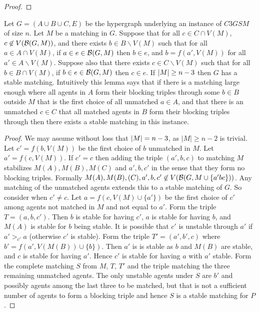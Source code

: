 \begin{definition}
\begin{proof}
\end{proof}
\begin{lemma}
Let $G=(A\cup B \cup C, E)$ be the hypergraph underlying an instance of $C3GSM$ of size $n$. Let $M$ be a matching in $G$. Suppose that for all $c \in C \cap V(M)$, $c \not\in V(\mathcal{B}(G, M))$, and there exists $b \in B \backslash V(M)$ such that for all $a \in A \cap V(M)$, if $a\in e \in \mathcal{B}(G,M)$ then $b \in e$, and $b = f(a',V(M))$ for all $a'\in A \backslash V(M)$. Suppose also that there exists $c \in C\backslash V(M)$ such that for all $b \in B \cap V(M)$, if $b \in e \in \mathcal{B}(G,M)$ then $c \in e$. If $\left|M\right| \geq n-3$ then $G$ has a stable matching. Intuitively this lemma says that if there is a matching large enough where all agents in $A$ form their blocking triples through some $b \in B$ outside $M$ that is the first choice of all unmatched $a \in A$, and that there is an unmatched $c \in C$ that all matched agents in $B$ form their blocking triples through then there exists a stable matching in this instance.
\end{lemma}
\begin{proof}
We may assume without loss that $\left|M\right| = n-3$, as $|M| \geq n-2$ is trivial. Let $c' = f(b, V(M))$ be the first choice of $b$ unmatched in $M$. Let $a' = f(c, V(M))$. If $c' = c$ then adding the triple $(a', b,c)$ to matching $M$ stabilizes $M(A), M(B), M(C)$ and $a', b, c'$ in the sense that they form no blocking triples. Formally $M(A),M(B),(C), a',b,c' \not\in V(\mathcal{B}(G, M \cup \{ a'bc\}))$. Any matching of the unmatched agents extends this to a stable matching of $G$. So consider when $c' \neq c$. Let $a = f(c, V(M) \cup\{a'\})$ be the first choice of $c'$ among agents not matched in $M$ and not equal to $a'$. Form the triple $T = (a, b, c')$. Then $b$ is stable for having $c'$, $a$ is stable for having $b$, and $M(A)$ is stable for $b$ being stable. It is possible that $c'$ is unstable through $a'$ if $a' >_{c'} a$ (otherwise $c'$ is stable). Form the triple $T' = (a', b', c)$ where $b'=f(a',V(M(B))\cup\{b\})$. Then $a'$ is is stable as $b$ and $M(B)$ are stable, and $c$ is stable for having $a'$. Hence $c'$ is stable for having $a$ with $a'$ stable. Form the complete matching $S$ from $M$, $T$, $T'$ and the triple matching the three remaining unmatched agents. The only unstable agents under $S$ are $b'$ and possibly agents among the last three to be matched, but that is not a sufficient number of agents to form a blocking triple and hence $S$ is a stable matching for $P$. 
\end{proof}

\end{definition}
